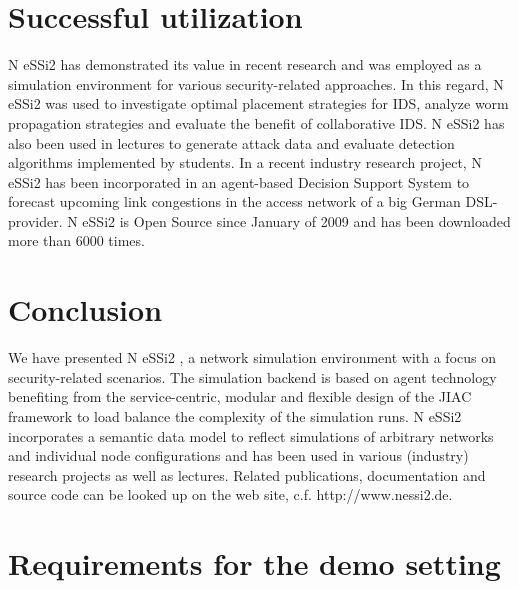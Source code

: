 \documentclass[sigconf]{aamas}
\begin{document}
\section{Successful utilization}

N eSSi2 has demonstrated its value in recent research and was employed as a simulation environment for various security-related approaches. In this regard, N eSSi2 was used to investigate optimal placement strategies for IDS, analyze worm propagation strategies and evaluate the benefit of collaborative IDS. N eSSi2 has also been used in lectures to generate attack data and evaluate detection algorithms implemented by students. In a recent industry research project, N eSSi2 has been incorporated in an agent-based Decision Support System to forecast upcoming link congestions in the access network of a big German DSL-provider.
N eSSi2 is Open Source since January of 2009 and has been
downloaded more than 6000 times.


\section{Conclusion}

We have presented N eSSi2 , a network simulation environment with a focus on security-related scenarios. The simulation backend is based on agent technology benefiting from the service-centric, modular and flexible design of the JIAC framework to load balance the complexity of the simulation runs. N eSSi2 incorporates a semantic data model to reflect simulations of arbitrary networks and individual node configurations and has been used in various (industry) research projects as well as lectures. Related publications, documentation and source code can be looked up on the web site, c.f. http://www.nessi2.de.\nocite{*}




\newpage

 



\newpage
\phantom{ }
\newpage

\section*{Requirements for the demo setting}




\end{document}
